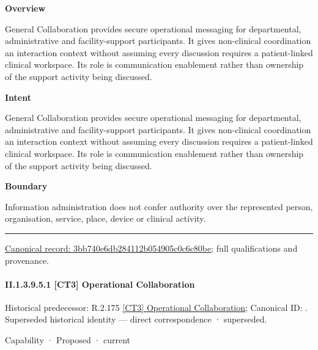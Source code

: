 \textbf{Overview}



General Collaboration provides secure operational messaging for departmental, administrative and facility-support participants. It gives non-clinical coordination an interaction context without assuming every discussion requires a patient-linked clinical workspace. Its role is communication enablement rather than ownership of the support activity being discussed.



\textbf{Intent}



General Collaboration provides secure operational messaging for departmental, administrative and facility-support participants. It gives non-clinical coordination an interaction context without assuming every discussion requires a patient-linked clinical workspace. Its role is communication enablement rather than ownership of the support activity being discussed.



\textbf{Boundary}



Information administration does not confer authority over the represented person, organisation, service, place, device or clinical activity.



\medskip\hrule\medskip

{\footnotesize \href{../../../../../../../continuum/strategy/capability/3bb740e6db284112b054905c0c6c80be.md}{Canonical record: 3bb740e6db284112b054905c0c6c80be}; full qualifications and provenance.}\par
\paragraph*{II.1.3.9.5.1 [CT3] Operational Collaboration}
\label{navigation:II.1.3.9.5.1}

{\small Historical predecessor: R.2.175 \hyperref[element:99e9d9763ec94140b7d7642f4b5966f6]{[CT3] Operational Collaboration}; Canonical ID: \texttt{}. Superseded historical identity — direct correspondence · superseded.}\par
\label{element:631fdb8b47084008ac9b5de28b26972b}
{\small Capability · Proposed · current}\par

